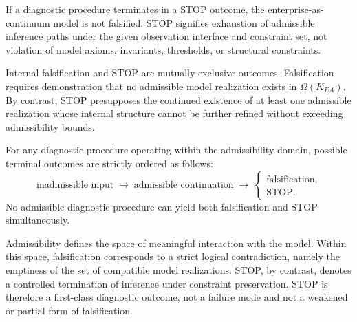 \medskip

\begin{proposition}
If a diagnostic procedure terminates in a STOP outcome, the
enterprise-as-continuum model is not falsified.
STOP signifies exhaustion of admissible inference paths under the given
observation interface and constraint set, not violation of model axioms,
invariants, thresholds, or structural constraints.
\end{proposition}

\medskip

\begin{proposition}
Internal falsification and STOP are mutually exclusive outcomes.
Falsification requires demonstration that no admissible model realization
exists in \(\Omega(K_{EA})\).
By contrast, STOP presupposes the continued existence of at least one
admissible realization whose internal structure cannot be further refined
without exceeding admissibility bounds.
\end{proposition}

\medskip

\begin{proposition}
For any diagnostic procedure operating within the admissibility domain,
possible terminal outcomes are strictly ordered as follows:
\[
\text{inadmissible input}
\;\rightarrow\;
\text{admissible continuation}
\;\rightarrow\;
\begin{cases}
\text{falsification},\\
\text{STOP}.
\end{cases}
\]
No admissible diagnostic procedure can yield both falsification and STOP
simultaneously.
\end{proposition}

\medskip

\begin{remark}
Admissibility defines the space of meaningful interaction with the model.
Within this space, falsification corresponds to a strict logical
contradiction, namely the emptiness of the set of compatible model
realizations.
STOP, by contrast, denotes a controlled termination of inference under
constraint preservation.
STOP is therefore a first-class diagnostic outcome, not a failure mode and
not a weakened or partial form of falsification.
\end{remark}
